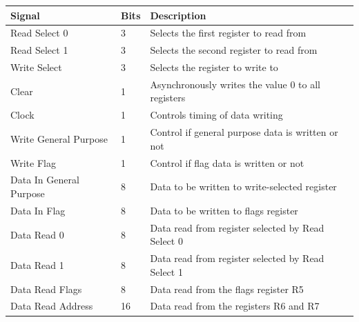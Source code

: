 \begin{table}[H]
    \centering
    \begin{tabular}{|l|l|l|} 
        \hline
        \textbf{\textbf{Signal}} & \textbf{Bits} & \textbf{Description}                                \\ 
        \hline
        Read Select 0            & 3             & Selects the first register to read from             \\ 
        \hline
        Read Select 1            & 3             & Selects the second register to read from            \\ 
        \hline
        Write Select             & 3             & Selects the register to write to                    \\ 
        \hline
        Clear                    & 1             & Asynchronously writes the value 0 to all registers  \\ 
        \hline
        Clock                    & 1             & Controls timing of data writing                     \\ 
        \hline
        Write General Purpose    & 1             & Control if general purpose data is written or not   \\ 
        \hline
        Write Flag               & 1             & Control if flag data is written or not              \\ 
        \hline
        Data In General Purpose  & 8             & Data to be written to write-selected register       \\ 
        \hline
        Data In Flag             & 8             & Data to be written to flags register                \\
        \hline
        Data Read 0              & 8             & Data read from register selected by Read Select 0   \\
        \hline
        Data Read 1              & 8             & Data read from register selected by Read Select 1   \\
        \hline
        Data Read Flags          & 8             & Data read from the flags register R5                \\
        \hline
        Data Read Address        & 16            & Data read from the registers R6 and R7              \\
        \hline
    \end{tabular}
\end{table}
\caption{Input and output signals of the register file}
\label{tab:implementation_logical_register_file_io}

